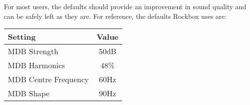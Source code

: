 {\begin{description}
    For most users, the defaults should provide an improvement in sound
    quality and can be safely left as they are. For reference, the defaults
    Rockbox uses are:
    \begin{table}[h!]
      \begin{center}
        \begin{tabular}{@{}lc@{}}\toprule
          Setting & Value \\\midrule
          MDB Strength & 50dB \\
          MDB Harmonics & 48\% \\
          MDB Centre Frequency & 60Hz \\
          MDB Shape & 90Hz \\\bottomrule
        \end{tabular}
      \end{center}
    \end{table}
      
  \end{description}
}

